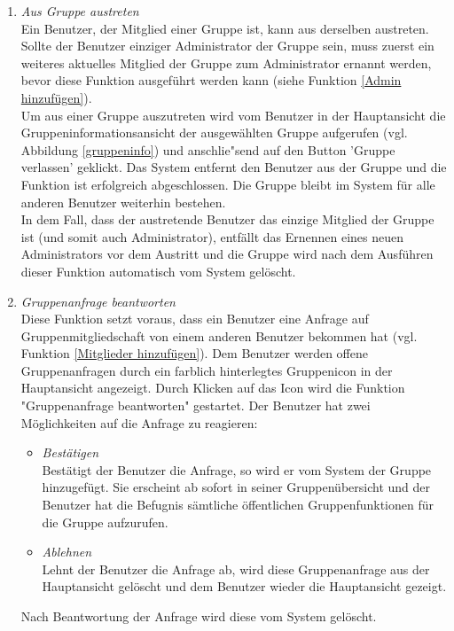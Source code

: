 \documentclass[parskip=full]{scrartcl}
\def\threedigits#1{%
  \ifnum#1<100 0\fi
  \ifnum#1<10 0\fi
  \number#1}
\begin{document}
\begin{enumerate}[label={\textbf{/F\protect\threedigits{\theenumi}0/}}, leftmargin=*, resume]
	
	\item \textit{Aus Gruppe austreten}\label{aus Gruppe austreten}\\
	Ein \gls{Benutzer}, der Mitglied einer Gruppe ist, kann aus derselben austreten. Sollte der Benutzer einziger Administrator der Gruppe sein, muss zuerst ein weiteres aktuelles Mitglied der Gruppe zum Administrator ernannt werden, bevor diese Funktion ausgeführt werden kann (siehe Funktion \ref{Admin hinzufügen}). \\
	Um aus einer Gruppe auszutreten wird vom Benutzer in der Hauptansicht die Gruppeninformationsansicht der ausgewählten Gruppe aufgerufen (vgl. Abbildung \ref{gruppeninfo}) und anschlie"send auf den Button 'Gruppe verlassen' geklickt. Das System entfernt den Benutzer aus der Gruppe und die Funktion ist erfolgreich abgeschlossen. Die Gruppe bleibt im System für alle anderen Benutzer weiterhin bestehen.\\
	In dem Fall, dass der austretende Benutzer das einzige Mitglied der Gruppe ist (und somit auch Administrator), entfällt das Ernennen eines neuen Administrators vor dem Austritt und die Gruppe wird nach dem Ausführen dieser Funktion automatisch vom System gelöscht.
	
	\item \textit{Gruppenanfrage beantworten}\label{Gruppenanfrage beantworten} \\
	Diese Funktion setzt voraus, dass ein Benutzer eine Anfrage auf Gruppenmitgliedschaft von einem anderen Benutzer bekommen hat (vgl. Funktion \ref{Mitglieder hinzufügen}). Dem Benutzer werden offene Gruppenanfragen durch ein farblich hinterlegtes Gruppenicon in der Hauptansicht angezeigt. Durch Klicken auf das Icon wird die Funktion "Gruppenanfrage beantworten" gestartet. Der Benutzer hat zwei Möglichkeiten auf die Anfrage zu reagieren:
	\begin{itemize}
		\item \textit{Bestätigen} \\Bestätigt der Benutzer die Anfrage, so wird er vom System der Gruppe hinzugefügt. Sie erscheint ab sofort in seiner Gruppenübersicht und der Benutzer hat die Befugnis sämtliche öffentlichen Gruppenfunktionen für die Gruppe aufzurufen.
		\item \textit{Ablehnen} \\Lehnt der Benutzer die Anfrage ab, wird diese Gruppenanfrage aus der Hauptansicht gelöscht und dem Benutzer wieder die Hauptansicht gezeigt.
	\end{itemize}
Nach Beantwortung der Anfrage wird diese vom System gelöscht.
\end{enumerate}
\end{document}
